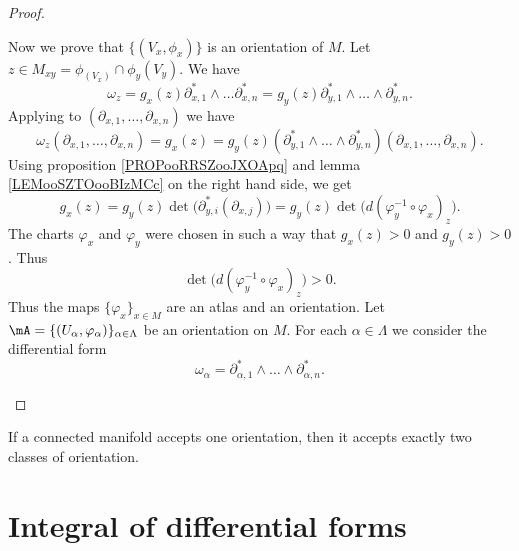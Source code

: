 \begin{proof}
\begin{subproof}
		Now we prove that \( \{ (V_x,\phi_x) \}\) is an orientation of \( M\). Let \( z\in M_{xy}=\phi_(V_x)\cap \phi_y(V_y)\). We have
		\begin{equation}
			\omega_z=g_x(z)\partial_{x,1}^*\wedge\ldots\partial^*_{x,n}=g_y(z)\partial_{y,1}^*\wedge\ldots\wedge\partial_{y,n}^*.
		\end{equation}
		Applying to \( (\partial_{x,1},\ldots,\partial_{x,n})\) we have
		\begin{equation}
			\omega_z(\partial_{x,1},\ldots,\partial_{x,n})=g_x(z)=g_y(z)(\partial_{y,1}^*\wedge\ldots\wedge\partial_{y,n}^*)(\partial_{x,1},\ldots,\partial_{x,n}).
		\end{equation}
		Using proposition \ref{PROPooRRSZooJXOApq} and lemma \ref{LEMooSZTOooBIzMCc} on the right hand side, we get
		\begin{equation}
			g_x(z)=g_y(z)\det\Big( \partial_{y,i}^*(\partial_{x,j}) \Big)=g_y(z)\det\big( d(\varphi_y^{-1}\circ\varphi_x)_z \big).
		\end{equation}
		The charts \( \varphi_x\) and \( \varphi_y\) were chosen in such a way that \( g_x(z)>0\) and \( g_y(z)>0\). Thus
		\begin{equation}
			\det\big( d(\varphi_y^{-1}\circ\varphi_x)_z \big)>0.
		\end{equation}
		Thus the maps \( \{ \varphi_x \}_{x\in M}\) are an atlas and an orientation.
		\spitem[\( \Rightarrow\)]
		Let \( \mA=\{ (U_{\alpha}, \varphi_{\alpha}) \}_{\alpha\in \Lambda}\) be an orientation on \( M\). For each \( \alpha\in \Lambda\) we consider the differential form
		\begin{equation}
			\omega_{\alpha}=\partial_{\alpha,1}^*\wedge\ldots \wedge\partial_{\alpha,n}^*.
		\end{equation}
	\end{subproof}
\end{proof}


\begin{proposition}		\label{PROPooNCNJooHFngBW}
	If a connected manifold accepts one orientation, then it accepts exactly two classes of orientation.
\end{proposition}

\section{Integral of differential forms}

